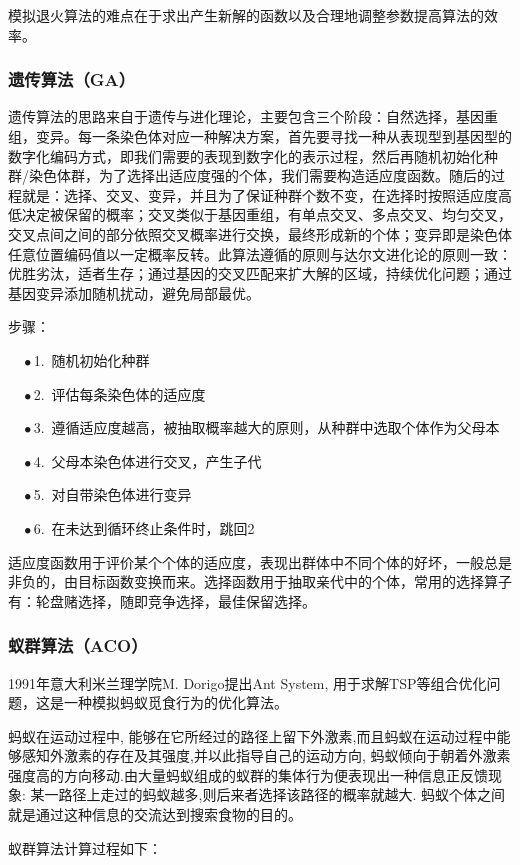 模拟退火算法的难点在于求出产生新解的函数以及合理地调整参数提高算法的效率。
\subsubsection{遗传算法（GA）\cite{mirjalili2019genetic}}
遗传算法的思路来自于遗传与进化理论，主要包含三个阶段：自然选择，基因重组，变异。每一条染色体对应一种解决方案，首先要寻找一种从表现型到基因型的数字化编码方式，即我们需要的表现到数字化的表示过程，然后再随机初始化种群/染色体群，为了选择出适应度强的个体，我们需要构造适应度函数。随后的过程就是：选择、交叉、变异，并且为了保证种群个数不变，在选择时按照适应度高低决定被保留的概率；交叉类似于基因重组，有单点交叉、多点交叉、均匀交叉，交叉点间之间的部分依照交叉概率进行交换，最终形成新的个体；变异即是染色体任意位置编码值以一定概率反转。此算法遵循的原则与达尔文进化论的原则一致：优胜劣汰，适者生存；通过基因的交叉匹配来扩大解的区域，持续优化问题；通过基因变异添加随机扰动，避免局部最优。

步骤：

$\quad \bullet$1.\ 随机初始化种群

$\quad \bullet$2.\ 评估每条染色体的适应度

$\quad \bullet$3.\ 遵循适应度越高，被抽取概率越大的原则，从种群中选取个体作为父母本

$\quad \bullet$4.\ 父母本染色体进行交叉，产生子代

$\quad \bullet$5.\ 对自带染色体进行变异

$\quad \bullet$6.\ 在未达到循环终止条件时，跳回2

适应度函数用于评价某个个体的适应度，表现出群体中不同个体的好坏，一般总是非负的，由目标函数变换而来。选择函数用于抽取亲代中的个体，常用的选择算子有：轮盘赌选择，随即竞争选择，最佳保留选择。
\subsubsection{蚁群算法（ACO）}
1991年意大利米兰理学院M. Dorigo提出Ant System\cite{li2022circular}, 用于求解TSP等组合优化问题，这是一种模拟蚂蚁觅食行为的优化算法。

蚂蚁在运动过程中, 能够在它所经过的路径上留下外激素,而且蚂蚁在运动过程中能够感知外激素的存在及其强度,并以此指导自己的运动方向, 蚂蚁倾向于朝着外激素强度高的方向移动.由大量蚂蚁组成的蚁群的集体行为便表现出一种信息正反馈现象: 某一路径上走过的蚂蚁越多,则后来者选择该路径的概率就越大. 蚂蚁个体之间就是通过这种信息的交流达到搜索食物的目的。


蚁群算法计算过程如下：

